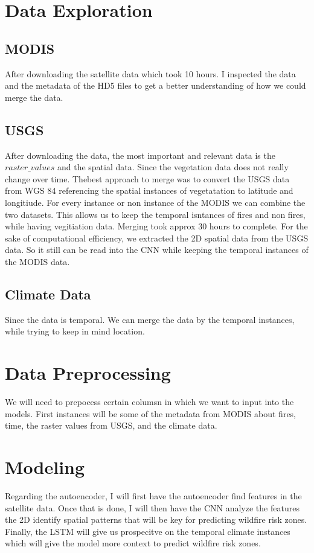 \documentclass{article}
\begin{document}
\section{Data Exploration}

\subsection{MODIS}

After downloading the satellite data which took 10 hours. I inspected the data and the metadata of the HD5 files to get a better understanding of how we could merge the data. 


\subsection{USGS}
After downloading the data, the most important and relevant data is the $\textit{raster\_values}$ and the spatial data. Since the vegetation data does not really change over time.
Thebest approach to merge was to convert the USGS data from WGS 84 referencing the spatial instances of vegetatation to latitude and longitiude. For every instance or non instance of the MODIS we can combine
the two datasets. This allows us to keep the temporal isntances of fires and non fires, while having vegitiation data. Merging took approx 30 hours to complete. For the sake of computational efficiency, 
we extracted the 2D spatial data from the USGS data. So it still can be read into the CNN while keeping the temporal instances of the MODIS data.

\subsection{Climate Data}
Since the data is temporal. We can merge the data by the temporal instances, while trying to keep in mind location. 

\section{Data Preprocessing}
We will need to prepocess certain columsn in which we want to input into the models. First instances will be some of the metadata from MODIS about fires, time, the raster values from USGS, and the climate data.


\section{Modeling}
Regarding the autoencoder, I will first have the autoencoder find features in the satellite data. Once that is done, 
I will then have the CNN analyze the features the 2D identify spatial patterns that will be key for predicting wildfire risk zones.
Finally, the LSTM will give us prospecitve on the temporal climate instances which will give the model more context to predict wildfire risk zones.
\end{document}
